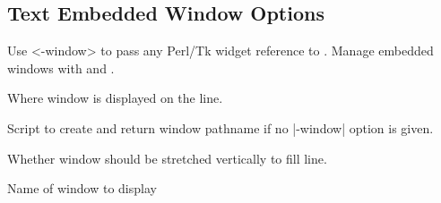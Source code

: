 \subsection*{Text Embedded Window Options}

Use <-window> to pass any Perl/Tk widget reference to .
Manage embedded windows with  and .

\begin{enum}{1cm}

Where window is displayed on the line.

Script to create and return window pathname if no |-window| option is given.

Whether window should be stretched vertically to fill line. 

Name of window to display

\end{enum}

